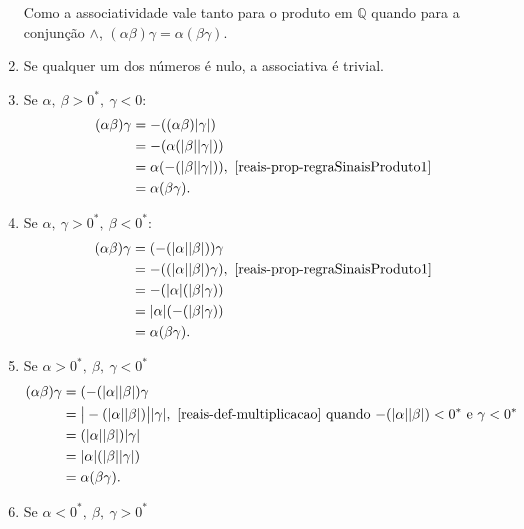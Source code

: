 \documentclass[../main.tex]{subfiles}
\begin{document}
\begin{dem}
\begin{enumerate}
            Como a associatividade vale tanto para o produto em $\mathbb{Q}$ quando para a conjunção $\land$, $(\alpha\beta)\gamma = \alpha(\beta\gamma)$. 
        \item Se qualquer um dos números é nulo, a associativa é trivial.
        \item Se $\alpha,\ \beta > 0^*,\ \gamma < 0$: \\
            \begin{align*}
                (\alpha\beta)\gamma &= -((\alpha\beta)\abs{\gamma}) \\
                &= -(\alpha (\abs{\beta}\abs{\gamma})) \\
                &= \alpha (-(\abs{\beta}\abs{\gamma})), \text{ \Cref{reais-prop-regraSinaisProduto1}}\\
                &= \alpha(\beta\gamma).
            \end{align*}
        \item Se $\alpha,\ \gamma > 0^*,\ \beta < 0^*$: \\
            \begin{align*}
                (\alpha\beta)\gamma &=
                (-(\abs{\alpha}\abs{\beta}))\gamma \\
                &=- ((\abs{\alpha}\abs{\beta})\gamma), \text{ \Cref{reais-prop-regraSinaisProduto1}} \\
                &= - (\abs{\alpha}(\abs{\beta}\gamma)) \\
                &= \abs{\alpha}(-(\abs{\beta}\gamma)) \\
                &= \alpha(\beta\gamma).
            \end{align*}
        \item Se $\alpha > 0^*,\ \beta,\ \gamma < 0^*$
            \begin{align*}
                (\alpha\beta)\gamma 
                &= (-(\abs{\alpha}\abs{\beta})\gamma \\
                &= \big|-(\abs{\alpha}\abs{\beta})\big| \abs{\gamma}, \text{ \Cref{reais-def-multiplicacao} quando 
                    $-(\abs{\alpha}\abs{\beta}) < 0^*$ e $\gamma < 0^*$} \\
                &= (\abs{\alpha}\abs{\beta})\abs{\gamma} \\
                &= \abs{\alpha} (\abs{\beta}\abs{\gamma}) \\
                &= \alpha(\beta\gamma).
            \end{align*}
        \item Se $\alpha < 0^*,\ \beta,\ \gamma > 0^*$

\end{enumerate}
\end{dem}
\end{document}
